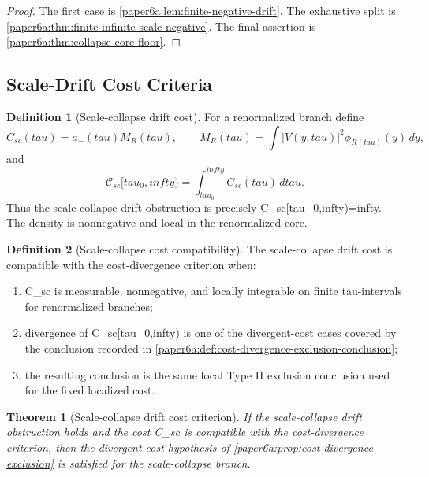 \documentclass[11pt]{amsart}
\def\({}%
\def\){}%
\def\mathfrak#1{#1}%
\def\mathrm#1{#1}%
\def\tau{tau}%
\def\infty{infty}%
\theoremstyle{plain}
\newtheorem{theorem}{Theorem}[section]
\theoremstyle{definition}
\newtheorem{definition}[definition]{Definition}
\theoremstyle{remark}
\begin{document}
\begin{proof}
The first case is \cref{paper6a:lem:finite-negative-drift}.  The exhaustive
split is \cref{paper6a:thm:finite-infinite-scale-negative}.  The final
assertion is \cref{paper6a:thm:collapse-core-floor}.
\end{proof}

\subsection{Scale-Drift Cost Criteria}

\begin{definition}[Scale-collapse drift cost]\label{paper6a:def:scale-collapse-cost}
For a renormalized branch define
\[
  \mathfrak C_{\mathrm{sc}}(\tau)
  =
  a_-(\tau)M_R(\tau),
  \qquad
  M_R(\tau)=\int |V(y,\tau)|^2\phi_{R(\tau)}(y)\,dy,
\]
and
\[
  \mathcal C_{\mathrm{sc}}[\tau_0,\infty)
  =
  \int_{\tau_0}^{\infty}\mathfrak C_{\mathrm{sc}}(\tau)\,d\tau .
\]
Thus the scale-collapse drift obstruction is precisely
\(\mathcal C_{\mathrm{sc}}[\tau_0,\infty)=\infty\).  The density is
nonnegative and local in the renormalized core.
\end{definition}

\begin{definition}[Scale-collapse cost compatibility]\label{paper6a:def:scale-collapse-cost-compatibility}
The scale-collapse drift cost is compatible with the cost-divergence criterion
when:
\begin{enumerate}[label=\textup{(\roman*)}]
\item \(\mathfrak C_{\mathrm{sc}}\) is measurable, nonnegative, and locally
integrable on finite \(\tau\)-intervals for renormalized branches;
\item divergence of \(\mathcal C_{\mathrm{sc}}[\tau_0,\infty)\) is one of the
divergent-cost cases covered by the conclusion recorded in
\cref{paper6a:def:cost-divergence-exclusion-conclusion};
\item the resulting conclusion is the same local Type II exclusion conclusion
used for the fixed localized cost.
\end{enumerate}
\end{definition}

\begin{theorem}[Scale-collapse drift cost criterion]
\label{paper6a:thm:scale-collapse-drift-cost}
If the scale-collapse drift obstruction holds and the cost
\(\mathfrak C_{\mathrm{sc}}\) is compatible with the cost-divergence criterion, then the divergent-cost hypothesis
of \cref{paper6a:prop:cost-divergence-exclusion} is satisfied for the
scale-collapse branch.
\end{theorem}
\end{document}
